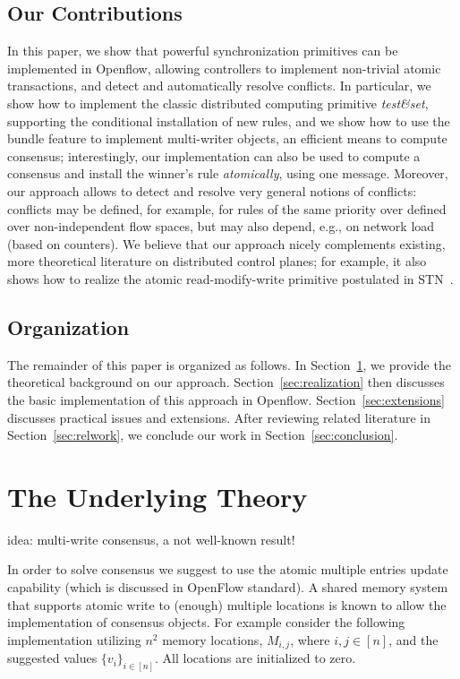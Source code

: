 \documentclass[conference]{sigcomm-alternate}
\begin{document}
\subsection{Our Contributions}

In this paper, we show that powerful synchronization primitives
can be implemented in Openflow, allowing controllers to implement
non-trivial atomic transactions, and detect and
automatically resolve conflicts. In particular, we show how to implement
the classic distributed computing primitive
\emph{test\&set}, supporting the conditional installation of new rules,
and we show how to use the bundle feature to implement
multi-writer objects, an efficient means to compute consensus;
interestingly, our implementation can also be used to compute a consensus
and install the winner's rule \emph{atomically}, using one message.
Moreover, our approach allows to detect and resolve very general notions of conflicts:
conflicts may be defined, for example, for rules of the same priority over
defined over non-independent flow spaces, but may also depend, e.g., on 
network load (based on counters).
We believe that our approach nicely complements
existing, more theoretical literature on distributed control planes; for example,
it also shows how to realize the atomic read-modify-write primitive postulated in
STN~\cite{stn}.

\subsection{Organization}

The remainder of this paper is organized as follows.
In Section~\ref{sec:background}, we provide the theoretical
background on our approach. Section~\ref{sec:realization}
then discusses the basic implementation of this approach in Openflow.
Section~\ref{sec:extensions} discusses practical issues and extensions.
After reviewing related literature in Section~\ref{sec:relwork},
we conclude our work in
Section~\ref{sec:conclusion}.


\section{The Underlying Theory}\label{sec:background}

idea: multi-write consensus, a not well-known result!

In order to solve consensus we suggest to use the atomic multiple entries update capability (which is discussed in OpenFlow standard). A shared memory system that supports atomic write to (enough) multiple locations is known to allow the implementation of consensus objects. For example consider the following implementation utilizing $n^2$ memory locations, $M_{i,j}$, where $i,j\in[n]$, and the suggested values $\{v_i\}_{i\in [n]}$. All locations are initialized to zero.
\end{document}
